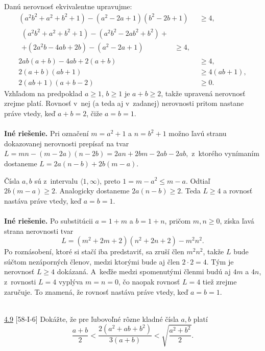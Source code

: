 \rieh Danú nerovnosť ekvivalentne upravujme:
\begin{align*}
(a^2 b^2 + a^2 + b^2 + 1) - (a^2 - 2a + 1)(b^2 - 2b + 1) &\geq 4,\\
\begin{split}(a^2 b^2 + a^2 + b^2 + 1) - (a^2 b^2 - 2ab^2 + b^2 )+ \\+ (2a^2b - 4ab + 2b) - (a^2 - 2a + 1) &\geq 4,\end{split}\\
2ab(a + b) - 4ab + 2(a + b) &\geq 4,\\
2(a + b)(ab + 1) &\geq 4(ab + 1),\\
2(ab + 1)(a + b - 2) &\geq0.
\end{align*}
Vzhľadom na predpoklad $a\geq 1$, $b \geq 1$ je $a + b \geq 2$, takže upravená nerovnosť zrejme platí. Rovnosť v~nej (a teda aj v~zadanej) nerovnosti pritom nastane práve vtedy, keď $a + b = 2$, čiže $a = b = 1$.\\
\\
\textbf{Iné riešenie.} Pri označení $m = a^2 +1$ a $n = b^2 +1$ možno ľavú stranu dokazovanej nerovnosti prepísať na tvar $L = mn-(m-2a)(n-2b) = 2an+2bm-2ab-2ab,$ z~ktorého vynímaním dostaneme $L = 2a(n - b) + 2b(m - a)$.

Čísla $a, b$ sú z~intervalu $\langle 1, \infty)$, preto $1 = m - a^2 \leq m - a$. Odtiaľ $2b(m - a) \geq 2$. Analogicky dostaneme $2a(n - b) \geq 2$. Teda $L \geq 4$ a rovnosť nastáva práve vtedy, keď $a = b = 1$.\\
\\
\textbf{Iné riešenie.} Po substitúcii $a = 1 + m$ a $b = 1 + n$, pričom $m, n \geq 0$, získa ľavá strana nerovnosti tvar $$L = (m^2 + 2m + 2)(n^2 + 2n + 2) - m^2 n^2.$$
Po roznásobení, ktoré si stačí iba predstaviť, sa zruší člen $m^2 n^2$, takže $L$ bude súčtom nezáporných členov, medzi ktorými bude aj člen $2 \cdot 2 = 4$. Tým je nerovnosť $L \geq 4$ dokázaná. A~keďže medzi spomenutými členmi budú aj $4m$ a $4n$, z~rovnosti $L = 4$ vyplýva $m = n = 0$, čo naopak rovnosť $L = 4$ tiež zrejme zaručuje. To znamená, že rovnosť nastáva práve vtedy, keď $a = b = 1$.\\
\\
\begin{tcolorbox}[breakable,notitle,boxrule=0pt,colback=light-gray,colframe=light-gray]\ul{4.9} [58-I-6]
Dokážte, že pre ľubovoľné rôzne kladné čísla $a, b$ platí
$$\frac{a+b}{2}<\frac{2(a^2 + ab + b^2 )}{3(a+b)}<\sqrt{\frac{a^2+b^2}{2}}.$$

\end{tcolorbox}

